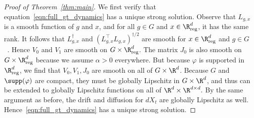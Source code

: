 \documentclass[twoside,a4paper,11pt]{article}
\renewcommand{\phi}{\varphi}
\newcommand{\reg}{\mathrm{reg}}
\theoremstyle{plain}
\begin{document}
\begin{proof}[Proof of Theorem~\ref{thm:main}]
We first verify that equation~\eqref{eqn:full_gt_dynamics}
has a unique strong solution.
Observe that $L_{g, x}$ is a smooth function
of $g$ and $x$, and for all $g \in G$
and $x \in \R^d_{\reg}$,
it has the same rank.
It follows that $L_{g,x}^{\dagger}$
and $(L_{g,x}^\top L_{g,x})^{\dagger/2}$
are smooth for $x \in \R^d_{\reg}$
and $g \in G$~\cite{constales1998closed}.
Hence $V_0$ and $V_1$ are smooth
on $G \times \R^d_{\reg}$.
The matrix $J_0$ is also smooth on $G \times \R^d_{\reg}$
because we assume $\alpha > 0$ everywhere.
But because $\phi$ is supported in $\R^d_{\reg}$,
we find that $V_0, V_1, J_0$ are smooth
on all of $G \times \R^d$.
Because $G$ and $\supp(\phi)$ are compact,
they must be globally Lipschitz in $G \times \R^d$,
and thus can be extended
to globally Lipschitz functions on all of $\R^d \times \R^{d \times d}.$
By the same argument as before, the drift and diffusion
for $dX_t$ are globally Lipschitz as well.
Hence~\eqref{eqn:full_gt_dynamics} has a unique strong solution.


\end{proof}
\end{document}
